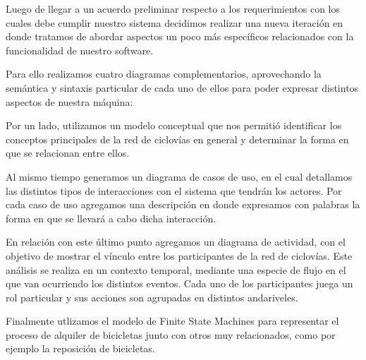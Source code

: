 Luego de llegar a un acuerdo preliminar respecto a los requerimientos con los cuales debe cumplir nuestro sistema decidimos
realizar una nueva iteración en donde tratamos de abordar aspectos un poco más específicos relacionados con la funcionalidad de 
nuestro software.

Para ello realizamos cuatro diagramas complementarios, aprovechando la semántica y sintaxis particular de cada uno de ellos 
para poder expresar distintos aspectos de nuestra máquina:

Por un lado, utilizamos un modelo conceptual que nos permitió identificar los conceptos principales de la red de ciclovías
en general y determinar la forma en que se relacionan entre ellos.

Al mismo tiempo generamos un diagrama de casos de uso, en el cual detallamos las distintos tipos de interacciones con el
sistema que tendrán los actores. Por cada caso de uso agregamos una descripción en donde expresamos con palabras la forma
en que se llevará a cabo dicha interacción.

En relación con este último punto agregamos un diagrama de actividad, con el objetivo de mostrar el vínculo entre los
participantes de la red de ciclovías. Este análisis se realiza en un contexto temporal, mediante una especie de flujo
en el que van ocurriendo los distintos eventos. Cada uno de los participantes juega un rol particular y sus acciones
son agrupadas en distintos andariveles.

Finalmente utlizamos el modelo de Finite State Machines para representar el proceso de alquiler de bicicletas junto con 
otros muy relacionados, como por ejemplo la reposición de bicicletas.

